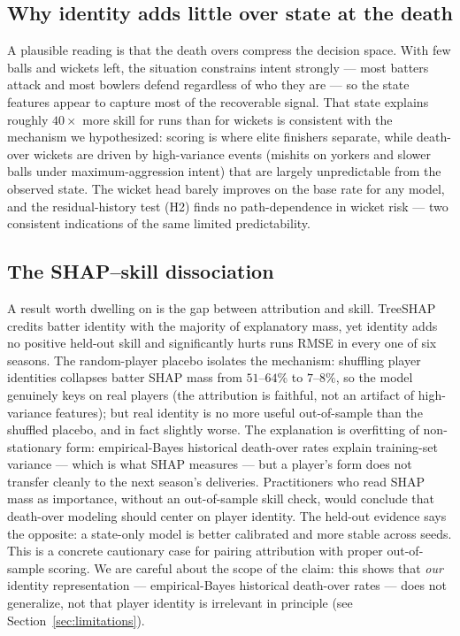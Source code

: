 \subsection{Why identity adds little over state at the death}
A plausible reading is that the death overs compress the decision space. With few
balls and wickets left, the situation constrains intent strongly --- most batters
attack and most bowlers defend regardless of who they are --- so the state features
appear to capture most of the recoverable signal. That state explains roughly
$40\times$ more skill for runs than for wickets is consistent with the mechanism we
hypothesized: scoring is where elite finishers separate, while death-over wickets
are driven by high-variance events (mishits on yorkers and slower balls under
maximum-aggression intent) that are largely unpredictable from the observed state.
The wicket head barely improves on the base rate for any model, and the
residual-history test (H2) finds no path-dependence in wicket risk --- two
consistent indications of the same limited predictability.

\subsection{The SHAP--skill dissociation}
A result worth dwelling on is the gap between attribution and skill. TreeSHAP
credits batter identity with the majority of explanatory mass, yet identity adds
no positive held-out skill and significantly hurts runs RMSE in every one of six
seasons. The random-player placebo isolates the mechanism: shuffling player
identities collapses batter SHAP mass from $51$--$64\%$ to $7$--$8\%$, so the model
genuinely keys on real players (the attribution is faithful, not an artifact of
high-variance features); but real identity is no more useful out-of-sample than the
shuffled placebo, and in fact slightly worse. The explanation is overfitting of
non-stationary form: empirical-Bayes historical death-over rates explain
training-set variance --- which is what SHAP measures --- but a player's form does
not transfer cleanly to the next season's deliveries. Practitioners who read SHAP
mass as importance, without an out-of-sample skill check, would conclude that
death-over modeling should center on player identity. The held-out evidence says
the opposite: a state-only model is better calibrated and more stable across seeds.
This is a concrete cautionary case for pairing attribution with proper out-of-sample
scoring. We are careful about the scope of the claim: this shows that \emph{our}
identity representation --- empirical-Bayes historical death-over rates --- does not
generalize, not that player identity is irrelevant in principle (see
Section~\ref{sec:limitations}).

